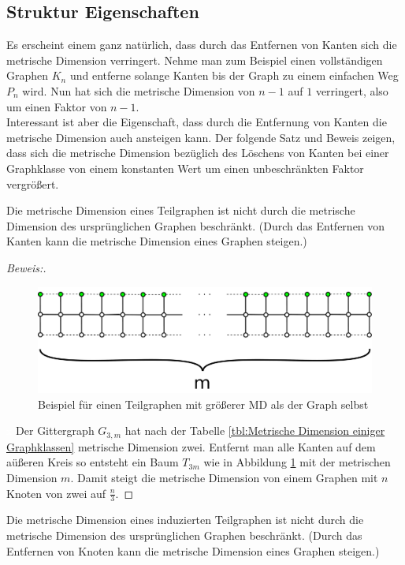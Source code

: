 \subsection{Struktur Eigenschaften}
Es erscheint einem ganz natürlich, dass durch das Entfernen von Kanten sich die metrische Dimension verringert. Nehme man zum Beispiel einen vollständigen Graphen $K_n$ und entferne solange Kanten bis der Graph zu einem einfachen Weg $P_n$ wird. Nun hat sich die metrische Dimension von $n-1$ auf $1$ verringert, also um einen Faktor von $n-1$.\\Interessant ist aber die Eigenschaft, dass durch die Entfernung von Kanten die metrische Dimension auch ansteigen kann. Der folgende Satz und Beweis zeigen, dass sich die metrische Dimension bezüglich des Löschens von Kanten bei einer Graphklasse von einem konstanten Wert um einen unbeschränkten Faktor vergrößert.
\begin{lem}
Die metrische Dimension eines Teilgraphen ist nicht durch die metrische Dimension des ursprünglichen Graphen beschränkt. (Durch das Entfernen von Kanten kann die metrische Dimension eines Graphen steigen.)
\end{lem}
\begin{proof}[Beweis:]$\;$
\begin{figure}[h!]
		\centering 		 
\includegraphics[width=420pt]{bilder/gitterzubaum.pdf}
   \caption{Beispiel für einen Teilgraphen mit größerer MD als der Graph selbst}
   \label{bild:Gitterbaum1}
\end{figure}
\textcolor{white}{x}\newline
Der Gittergraph $G_{3,m}$ hat nach der Tabelle \ref{tbl:Metrische Dimension einiger Graphklassen} metrische Dimension zwei. Entfernt man alle Kanten auf dem aüßeren Kreis so entsteht ein Baum $T_{3m}$ wie in Abbildung \ref{bild:Gitterbaum1} mit der metrischen Dimension $m$. Damit steigt die metrische Dimension von einem Graphen mit $n$ Knoten von zwei auf $\frac{n}{3}$.
\end{proof}
\begin{lem}
Die metrische Dimension eines induzierten Teilgraphen ist nicht durch die metrische Dimension des ursprünglichen Graphen beschränkt. (Durch das Entfernen von Knoten kann die metrische Dimension eines Graphen steigen.)
\end{lem}
